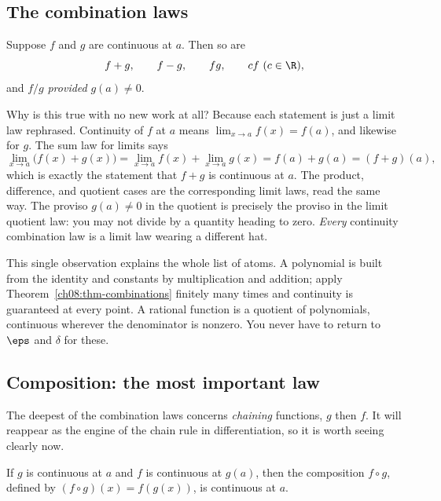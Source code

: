 \subsection{The combination laws}

\begin{theorem}
\label{ch08:thm-combinations}
Suppose $f$ and $g$ are continuous at $a$. Then so are
\[
  f+g,\qquad f-g,\qquad fg,\qquad cf \ (c\in\R),
\]
and $f/g$ \emph{provided} $g(a)\ne 0$.
\end{theorem}

\begin{whybox}
Why is this true with no new work at all? Because each statement is just a limit law
rephrased. Continuity of $f$ at $a$ means $\lim_{x\to a}f(x)=f(a)$, and likewise for $g$.
The sum law for limits says
\[
  \lim_{x\to a}\bigl(f(x)+g(x)\bigr)=\lim_{x\to a}f(x)+\lim_{x\to a}g(x)=f(a)+g(a)=(f+g)(a),
\]
which is exactly the statement that $f+g$ is continuous at $a$. The product, difference,
and quotient cases are the corresponding limit laws, read the same way. The proviso
$g(a)\ne 0$ in the quotient is precisely the proviso in the limit quotient law: you may
not divide by a quantity heading to zero. \emph{Every} continuity combination law is a
limit law wearing a different hat.
\end{whybox}

This single observation explains the whole list of atoms. A polynomial is built from the
identity and constants by multiplication and addition; apply Theorem~\ref{ch08:thm-combinations}
finitely many times and continuity is guaranteed at every point. A rational function is a
quotient of polynomials, continuous wherever the denominator is nonzero. You never have to
return to $\eps$ and $\delta$ for these.

\subsection{Composition: the most important law}

The deepest of the combination laws concerns \emph{chaining} functions, $g$ then $f$. It
will reappear as the engine of the chain rule in differentiation, so it is worth seeing
clearly now.

\begin{theorem}
\label{ch08:thm-composition}
If $g$ is continuous at $a$ and $f$ is continuous at $g(a)$, then the composition
$f\circ g$, defined by $(f\circ g)(x)=f(g(x))$, is continuous at $a$.
\end{theorem}

